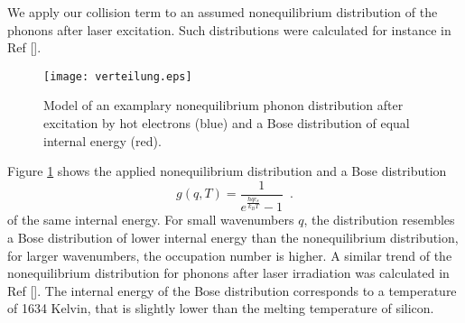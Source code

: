\documentclass[ aps, prb, reprint, groupedaddress]{revtex4-1}
\makeatletter
\newcommand{\citen}[1]{\def\NAT@spacechar{}[\citenum{#1}]}
\makeatother
\begin{document}
We apply our collision term to an assumed nonequilibrium distribution of the phonons after laser excitation. Such distributions were calculated for instance in Ref \citen{Kaiser00}.


 \begin{figure}[!h]
\texttt{[image: verteilung.eps]} %
\caption{Model of an examplary nonequilibrium phonon distribution after excitation by hot electrons (blue) and a Bose distribution of equal internal energy (red). }
\label{abb:distribution}
\end{figure}

Figure \ref{abb:distribution} shows the applied nonequilibrium distribution and a Bose distribution 
\begin{equation}
g(q,T)=\frac{1}{e^{\frac{\hbar q c_s}{k_BT}}-1} \enspace .
\end{equation}
of the same internal energy. For small wavenumbers $q$, the distribution resembles a Bose distribution of 
lower internal energy than the nonequilibrium distribution, for larger wavenumbers, the occupation 
number is higher. A similar trend of the nonequilibrium distribution for phonons after laser irradiation was calculated in Ref \citen{Kaiser00}.
The internal energy of the Bose distribution corresponds to a temperature of 1634 Kelvin, that is slightly lower than the melting temperature of silicon.

\end{document}
